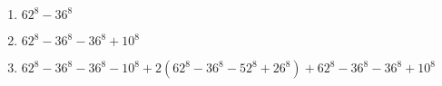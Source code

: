 \begin{enumerate}[label=(\alph*)]

\item $62^{8} - 36^{8}$

\item $62^{8} - 36^{8} - 36^{8} + 10^{8}$

\item $62^{8} - 36^{8} - 36^{8} - 10^{8} + 2(62^{8} - 36^{8} - 52^{8} + 26^{8}) 
+ 62^{8} - 36^{8} - 36^{8} + 10^{8}$

\end{enumerate}